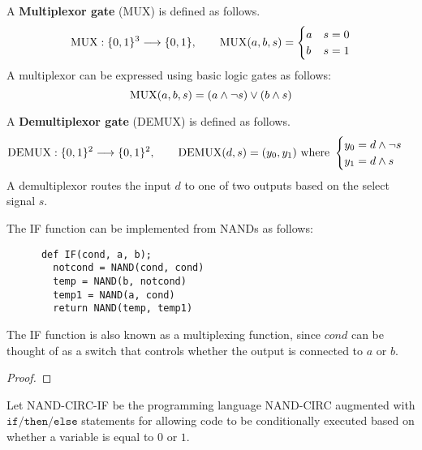   \begin{definition}
    A \textbf{Multiplexor gate} (MUX) is defined as follows.  
    \begin{equation}
      \MUX: \{0,1\}^3 \longrightarrow \{0,1\}, \qquad 
      \MUX (a, b, s) = \begin{cases}
        a & s = 0 \\
        b & s = 1
      \end{cases}
    \end{equation}
    A multiplexor can be expressed using basic logic gates as follows:
    \begin{equation}
      \MUX(a, b, s) = (a \wedge \neg s) \vee (b \wedge s)
    \end{equation}
  \end{definition}

  \begin{definition}
    A \textbf{Demultiplexor gate} (DEMUX) is defined as follows.  
    \begin{equation}
      \DEMUX: \{0,1\}^2 \longrightarrow \{0,1\}^2, \qquad 
      \DEMUX (d, s) = (y_0, y_1) \text{ where } \begin{cases}
        y_0 = d \wedge \neg s \\
        y_1 = d \wedge s
      \end{cases}
    \end{equation}
    A demultiplexor routes the input $d$ to one of two outputs based on the select signal $s$.
  \end{definition}

  \begin{definition}
    The IF function can be implemented from NANDs as follows: 
    \begin{lstlisting}
      def IF(cond, a, b);
        notcond = NAND(cond, cond) 
        temp = NAND(b, notcond)
        temp1 = NAND(a, cond)
        return NAND(temp, temp1)
    \end{lstlisting}
    The IF function is also known as a multiplexing function, since $cond$ can be thought of as a switch that controls whether the output is connected to $a$ or $b$. 
  \end{definition}
  \begin{proof}
    
  \end{proof}

  \begin{definition}
    Let NAND-CIRC-IF be the programming language NAND-CIRC augmented with $\texttt{if/then/else}$ statements for allowing code to be conditionally executed based on whether a variable is equal to $0$ or $1$. 
  \end{definition}

